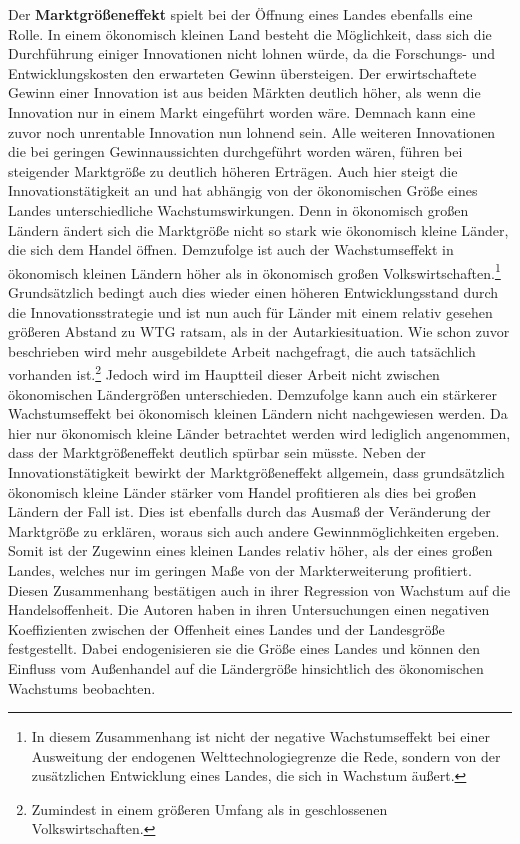 Der \textbf{Marktgr{\"o}{\ss}eneffekt} spielt bei der {\"O}ffnung eines Landes ebenfalls eine Rolle. In einem {\"o}konomisch kleinen Land besteht die M{\"o}glichkeit, dass sich die Durchf{\"u}hrung einiger Innovationen nicht lohnen w{\"u}rde, da die Forschungs- und Entwicklungskosten den erwarteten Gewinn {\"u}bersteigen. Der erwirtschaftete Gewinn einer Innovation ist aus beiden M{\"a}rkten  deutlich h{\"o}her, als wenn die Innovation nur in einem Markt eingef{\"u}hrt worden w{\"a}re. Demnach kann eine zuvor noch unrentable Innovation nun lohnend sein. Alle weiteren Innovationen die bei geringen Gewinnaussichten durchgef{\"u}hrt worden w{\"a}ren, f{\"u}hren bei steigender Marktgr{\"o}{\ss}e zu deutlich h{\"o}heren Ertr{\"a}gen.
Auch hier steigt die Innovationst{\"a}tigkeit an und hat abh{\"a}ngig von der {\"o}konomischen Gr{\"o}{\ss}e eines Landes unterschiedliche Wachstumswirkungen. Denn in {\"o}konomisch gro{\ss}en L{\"a}ndern {\"a}ndert sich die Marktgr{\"o}{\ss}e nicht so stark wie {\"o}konomisch kleine L{\"a}nder, die sich dem Handel {\"o}ffnen. Demzufolge ist auch der Wachstumseffekt in {\"o}konomisch kleinen L{\"a}ndern h{\"o}her als in {\"o}konomisch gro{\ss}en Volkswirtschaften.\footnote{In diesem Zusammenhang ist nicht der negative Wachstumseffekt bei einer Ausweitung der endogenen Welttechnologiegrenze die Rede, sondern von der zus{\"a}tzlichen Entwicklung eines Landes, die sich in Wachstum {\"a}u{\ss}ert.}\\
Grunds{\"a}tzlich bedingt auch dies wieder einen h{\"o}heren Entwicklungsstand durch die Innovationsstrategie und ist nun auch f{\"u}r L{\"a}nder mit einem relativ gesehen gr{\"o}{\ss}eren Abstand zu WTG ratsam, als in der Autarkiesituation. Wie schon zuvor beschrieben wird mehr ausgebildete Arbeit nachgefragt, die auch tats{\"a}chlich vorhanden ist.\footnote{Zumindest in einem gr{\"o}{\ss}eren Umfang als in geschlossenen Volkswirtschaften.} Jedoch wird im Hauptteil dieser Arbeit nicht zwischen {\"o}konomischen L{\"a}ndergr{\"o}{\ss}en unterschieden. Demzufolge kann auch ein st{\"a}rkerer Wachstumseffekt bei {\"o}konomisch kleinen L{\"a}ndern nicht nachgewiesen werden. Da hier nur {\"o}konomisch kleine L{\"a}nder betrachtet werden wird lediglich angenommen, dass der Marktgr{\"o}{\ss}eneffekt deutlich sp{\"u}rbar sein m{\"u}sste. Neben der Innovationst{\"a}tigkeit bewirkt der Marktgr{\"o}{\ss}eneffekt allgemein, dass grunds{\"a}tzlich {\"o}konomisch kleine L{\"a}nder st{\"a}rker  vom Handel profitieren als dies bei gro{\ss}en L{\"a}ndern der Fall ist. Dies ist ebenfalls durch das Ausma{\ss} der Ver{\"a}nderung der Marktgr{\"o}{\ss}e zu erkl{\"a}ren, woraus sich auch andere Gewinnm{\"o}glichkeiten ergeben. Somit ist der Zugewinn eines kleinen Landes relativ h{\"o}her, als der eines gro{\ss}en Landes, welches nur im geringen Ma{\ss}e von der Markt\-erweiterung profitiert. \newline Diesen Zusammenhang best{\"a}tigen auch \citet{Alesina.2005} in ihrer Regression von Wachstum auf die Handelsoffenheit. Die Autoren haben in ihren Untersuchungen einen negativen Koeffizienten zwischen der Offenheit eines Landes und der Landesgr{\"o}{\ss}e festgestellt. Dabei endogenisieren sie die Gr{\"o}{\ss}e eines Landes und k{\"o}nnen den Einfluss vom Au{\ss}enhandel auf die L{\"a}ndergr{\"o}{\ss}e hinsichtlich des {\"o}konomischen Wachstums beobachten.
